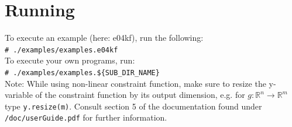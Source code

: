 \documentclass{book}
\begin{document}
\section{Running}
To execute an example (here: e04kf), run the following:\\
\texttt{\# ./examples/examples.e04kf}\\
\newline
To execute your own programs, run:\\
\texttt{\# ./examples/examples.\$\{SUB\_DIR\_NAME\}}\\
\newline
Note: While using non-linear constraint function, make sure to resize the y-variable of the constraint function by its output dimension, e.g. for ${\displaystyle g: \mathbb{R}^n \rightarrow \mathbb{R}^m}$ type \texttt{y.resize(m)}. Consult section 5 of the documentation found under \\ \texttt{/doc/userGuide.pdf} for further information.
\end{document}
